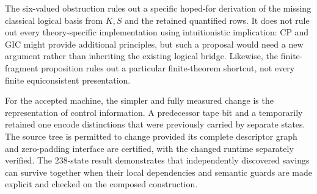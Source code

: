 The six-valued obstruction rules out a specific hoped-for derivation of
the missing classical logical basis from $K,S$ and the retained quantified
rows.  It does not rule out every theory-specific implementation using
intuitionistic implication: CP and GIC might provide additional principles,
but such a proposal would need a new argument rather than inheriting the
existing logical bridge.  Likewise, the finite-fragment proposition rules
out a particular finite-theorem shortcut, not every finite equiconsistent
presentation.

For the accepted machine, the simpler and fully measured change is the
representation of control information.  A predecessor tape bit and a
temporarily retained one encode distinctions that were previously carried
by separate states.  The source tree is permitted to change provided its
complete descriptor graph and zero-padding interface are certified, with
the changed runtime separately verified.  The
238-state result demonstrates that independently discovered savings can
survive together when their local dependencies and semantic guards are
made explicit and checked on the composed construction.
